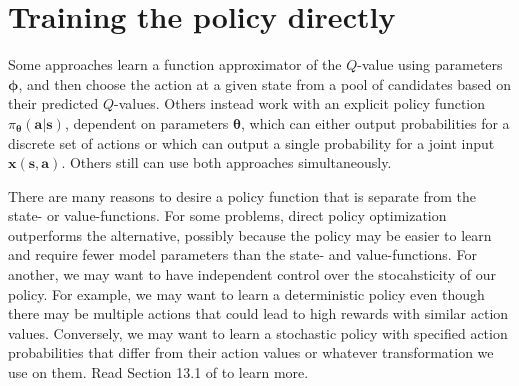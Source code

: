 \documentclass{article}
\begin{document}
\section{Training the policy directly}

Some approaches learn a function approximator of the $Q$-value using parameters $\boldsymbol{\phi}$, and then choose the action at a given state from a pool of candidates based on their predicted $Q$-values. Others instead work with an explicit policy function $\pi_{\boldsymbol{\theta}}(\mathbf{a}|\mathbf{s})$, dependent on parameters $\boldsymbol{\theta}$, which can either output probabilities for a discrete set of actions or which can output a single probability for a joint input $\mathbf{x}(\mathbf{s}, \mathbf{a})$. Others still can use both approaches simultaneously.

There are many reasons to desire a policy function that is separate from the state- or value-functions. For some problems, direct policy optimization outperforms the alternative, possibly because the policy may be easier to learn and require fewer model parameters than the state- and value-functions. For another, we may want to have independent control over the stocahsticity of our policy. For example, we may want to learn a deterministic policy even though there may be multiple actions that could lead to high rewards with similar action values. Conversely, we may want to learn a stochastic policy with specified action probabilities that differ from their action values or whatever transformation we use on them.  Read Section 13.1 of \cite{sutton_barto_rl} to learn more.
\end{document}

